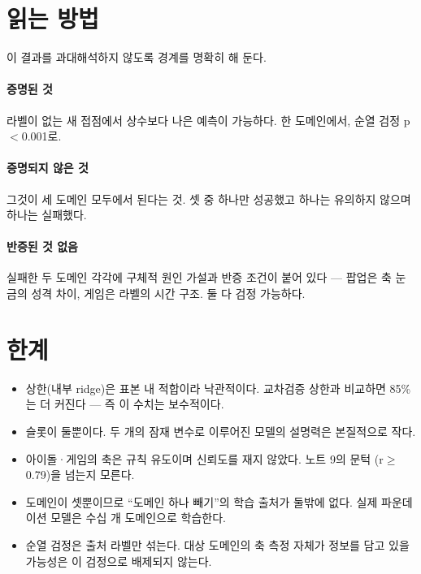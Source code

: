 \documentclass[10pt]{article}
\begin{document}
\section{읽는 방법}

이 결과를 과대해석하지 않도록 경계를 명확히 해 둔다.

\paragraph{증명된 것} 라벨이 없는 새 접점에서 상수보다 나은 예측이 가능하다.
한 도메인에서, 순열 검정 p$<$0.001로.

\paragraph{증명되지 않은 것} 그것이 세 도메인 모두에서 된다는 것. 셋 중 하나만
성공했고 하나는 유의하지 않으며 하나는 실패했다.

\paragraph{반증된 것 없음} 실패한 두 도메인 각각에 구체적 원인 가설과 반증 조건이
붙어 있다 --- 팝업은 축 눈금의 성격 차이, 게임은 라벨의 시간 구조. 둘 다 검정
가능하다.


\section{한계}

\begin{itemize}[leftmargin=1.1em,itemsep=0.15em]
\item 상한(내부 ridge)은 표본 내 적합이라 낙관적이다. 교차검증 상한과 비교하면
      85\%는 더 커진다 --- 즉 이 수치는 보수적이다.
\item 슬롯이 둘뿐이다. 두 개의 잠재 변수로 이루어진 모델의 설명력은 본질적으로 작다.
\item 아이돌·게임의 축은 규칙 유도이며 신뢰도를 재지 않았다. 노트 9의 문턱
      (r$\geq$0.79)을 넘는지 모른다.
\item 도메인이 셋뿐이므로 ``도메인 하나 빼기''의 학습 출처가 둘밖에 없다.
      실제 파운데이션 모델은 수십 개 도메인으로 학습한다.
\item 순열 검정은 출처 라벨만 섞는다. 대상 도메인의 축 측정 자체가 정보를
      담고 있을 가능성은 이 검정으로 배제되지 않는다.
\end{itemize}
\end{document}
